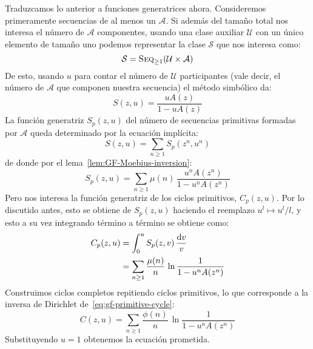   Traduzcamos lo anterior a funciones generatrices ahora.
  Consideremos primeramente
  secuencias de al menos un \(\mathcal{A}\).
  Si además del tamaño total
  nos interesa el número de \(\mathcal{A}\) componentes,
  usando una clase auxiliar \(\mathcal{U}\)
  con un único elemento de tamaño uno
  podemos representar la clase \(\mathcal{S}\)
  que nos interesa como:
  \begin{equation*}
    \mathcal{S}
      = \operatorname{\textsc{Seq}}_{\ge 1} (\mathcal{U} \times \mathcal{A})
  \end{equation*}
  De esto,
  usando \(u\)
  para contar el número de \(\mathcal{U}\) participantes
  (vale decir,
   el número de \(\mathcal{A}\) que componen nuestra secuencia)
  el método simbólico da:
  \begin{equation*}
    S(z, u)
      = \frac{u A(z)}{1 - u A(z)}
  \end{equation*}
  La función generatriz \(S_p(z, u)\)
  del número de secuencias primitivas formadas por \(\mathcal{A}\)
  queda determinado por la ecuación implícita:
  \begin{equation*}
    S(z, u)
      = \sum_{n \ge 1} S_p(z^n, u^n)
  \end{equation*}
  de donde por el lema~\ref{lem:GF-Moebius-inversion}:
  \begin{equation}
    \label{eq:ms-primitive-sequences}
    S_p(z, u)
      = \sum_{n \ge 1} \mu(n) \, \frac{u^n A(z^n)}{1 - u^n A(z^n)}
  \end{equation}
  Pero nos interesa la función generatriz de los ciclos primitivos,
  \(C_p(z, u)\).
  Por lo discutido antes,
  esto se obtiene de \(S_p(z, u)\)
  haciendo el reemplazo \(u^l \mapsto u^l / l\),
  y esto a su vez integrando término a término se obtiene como:
  \begin{align}
    C_p(z, u)
      &= \int_0^u S_p(z, v) \, \frac{\mathrm{d} v}{v} \notag \\
      &= \sum_{n \ge 1}
	   \frac{\mu(n)}{n} \, \ln \frac{1}{1 - u^n A(z^n)}
	    \label{eq:gf-primitive-cycle}
  \end{align}
  Construimos ciclos completos repitiendo ciclos primitivos,
  lo que corresponde a la inversa de Dirichlet
  de~\eqref{eq:gf-primitive-cycle}:
  \begin{equation}
    \label{eq:Cycle-binary}
    C(z, u)
      = \sum_{n \ge 1}
	  \frac{\phi(n)}{n} \, \ln \frac{1}{1 - u^n A(z^n)}
  \end{equation}
  Substituyendo \(u = 1\) obtenemos la ecuación prometida.

